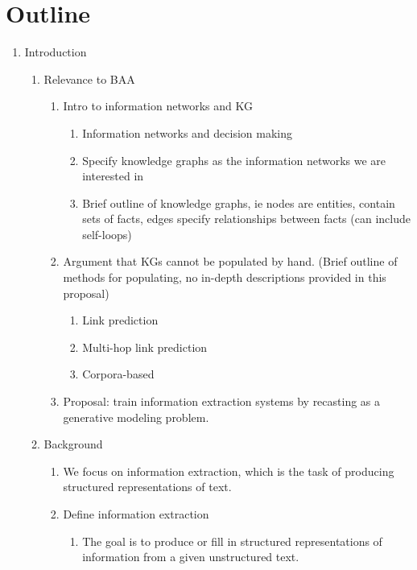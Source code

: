 \documentclass[12pt]{article}
\begin{document}
\section*{Outline}
\begin{enumerate}
\item Introduction
    \begin{enumerate}
    \item Relevance to BAA
        \begin{enumerate}
        \item Intro to information networks and KG
            \begin{enumerate}
            \item Information networks and decision making
            \item Specify knowledge graphs as the information networks we are interested in
            \item Brief outline of knowledge graphs, ie nodes are entities, contain sets of facts,
                edges specify relationships between facts (can include self-loops)
            \end{enumerate}
        \item Argument that KGs cannot be populated by hand. (Brief outline of methods for populating,
            no in-depth descriptions provided in this proposal)
            \begin{enumerate}
            \item Link prediction
            \item Multi-hop link prediction
            \item Corpora-based
            \end{enumerate}
        \item Proposal: train information extraction systems by recasting as a
            generative modeling problem.
        \end{enumerate}
    \item Background
        \begin{enumerate}
        \item We focus on information extraction, which is the task of producing structured
            representations of text.
        \item Define information extraction
            \begin{enumerate}
            \item The goal is to produce or fill in structured representations of information from
                a given unstructured text.

\end{enumerate}
\end{enumerate}
\end{enumerate}
\end{enumerate}
\end{document}
